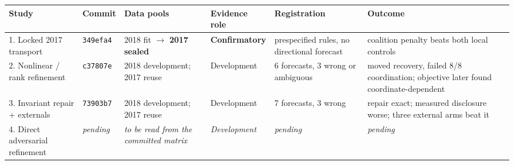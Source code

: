 \begin{tabular}{@{}p{2.5cm}p{1.2cm}p{2.2cm}p{1.9cm}p{2.5cm}p{3.5cm}@{}}
\toprule
Study & Commit & Data pools & Evidence role & Registration & Outcome \\
\midrule
1. Locked 2017 transport & \texttt{349efa4} & 2018 fit $\rightarrow$ \textbf{2017 sealed} & \textbf{Confirmatory} & prespecified rules, no directional forecast & coalition penalty beats both local controls \\
2. Nonlinear / rank refinement & \texttt{c37807e} & 2018 development; 2017 reuse & Development & 6 forecasts, 3 wrong or ambiguous & moved recovery, failed 8/8 coordination; objective later found coordinate-dependent \\
3. Invariant repair + externals & \texttt{73903b7} & 2018 development; 2017 reuse & Development & 7 forecasts, 3 wrong & repair exact; measured disclosure worse; three external arms beat it \\
4. Direct adversarial refinement & \emph{pending} & \emph{to be read from the committed matrix} & \emph{Development} & \emph{pending} & \emph{pending} \\
\bottomrule
\end{tabular}
